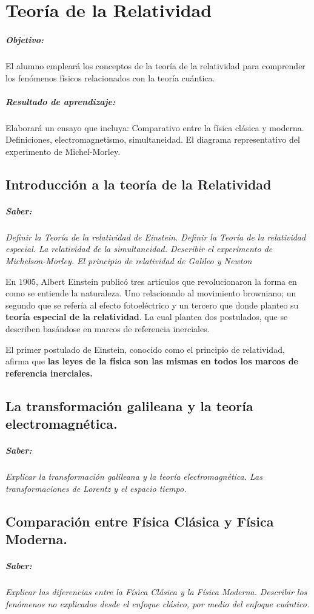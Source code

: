 \chapter{Teoría de la Relatividad}
\paragraph{Objetivo:}
El alumno empleará los conceptos de la teoría de la relatividad para comprender los fenómenos físicos relacionados con la teoría cuántica.

\paragraph{Resultado de aprendizaje:}
Elaborará un ensayo que incluya:
Comparativo entre la física clásica y moderna. Definiciones, electromagnetismo, simultaneidad. El diagrama representativo del experimento de Michel-Morley.
 

\section{Introducción a la teoría de la Relatividad}
\paragraph{Saber:}
\textit{Definir la Teoría de la
	relatividad de Einstein. Definir la Teoría de la relatividad especial. La
	relatividad de la simultaneidad. Describir el experimento de Michelson-Morley. El principio de
	relatividad de Galileo y Newton}

En 1905, Albert Einstein publicó tres artículos que revolucionaron la forma en como se entiende la naturaleza. Uno relacionado al movimiento browniano; un segundo que se refería al efecto fotoeléctrico y un tercero que donde planteo su \textbf{teoría especial de la relatividad}. La cual plantea dos postulados, que se describen basándose en marcos de referencia inerciales. 

El primer postulado de Einstein, conocido como el principio de relatividad, afirma que \textbf{las leyes de la física son las mismas en todos los marcos de referencia inerciales.}

 
\section{La transformación galileana y la
		teoría electromagnética.}
\paragraph{Saber:}
\textit{Explicar la	transformación 	galileana y la teoría electromagnética. Las transformaciones de Lorentz y el espacio tiempo.}

\section{Comparación entre Física Clásica y Física Moderna.}
\paragraph{Saber:}
\textit{Explicar las diferencias entre la Física Clásica y la Física Moderna. Describir los fenómenos no explicados desde el enfoque clásico, por medio del enfoque cuántico.}